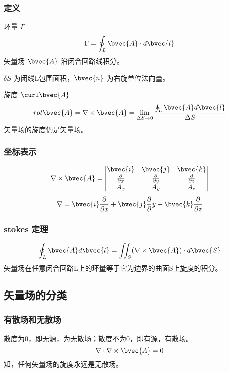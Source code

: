 \subsubsection{定义}
环量 $\Gamma$
\begin{equation}\label{VecAnl_eq10}
\Gamma=\oint_L \bvec{A} \cdot d \bvec{l}
\end{equation}
矢量场 $\bvec{A}$ 沿闭合回路线积分。

$\delta S$ 为闭线L包围面积，$\bvec{n}$ 为右旋单位法向量。

旋度 $\curl\bvec{A}$
\begin{equation}\label{VecAnl_eq11}
rot \bvec{A}=\nabla \times \bvec{A}=\lim_{\Delta S \to 0} \frac{\oint_L \bvec{A} d\bvec{l}}{\Delta S}
\end{equation}
矢量场的旋度仍是矢量场。

\subsubsection{坐标表示}
\begin{equation}\label{VecAnl_eq12}
\nabla \times \bvec{A}=
\begin{vmatrix}
\bvec{i} & \bvec{j} & \bvec{k} \\
\frac{\partial}{\partial x} & \frac{\partial}{\partial y} & \frac{\partial}{\partial z}\\
A_x & A_y & A_z
\end{vmatrix}
\end{equation}
\begin{equation}\label{VecAnl_eq13}
\nabla = \bvec{i}\frac{\partial}{\partial x}+ \bvec{j} \frac{\partial}{\partial}y + \bvec{k} \frac{\partial}{\partial z}
\end{equation}

\subsubsection{stokes 定理}
\begin{equation}\label{VecAnl_eq14}
\oint_L \bvec{A} d\bvec{l}=\iint_S (\nabla \times \bvec{A})\cdot d\bvec{S}
\end{equation}
矢量场在任意闭合回路L上的环量等于它为边界的曲面S上旋度的积分。

\subsection{矢量场的分类}
\subsubsection{有散场和无散场}
散度为0，即无源，为无散场；散度不为0，即有源，有散场。
\begin{equation}\label{VecAnl_eq24}
\nabla\cdot\nabla\times\bvec{A}=0
\end{equation}
知，任何矢量场的旋度永远是无散场。

